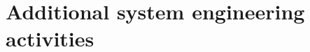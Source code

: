%
\thispagestyle{fancy}
\chapter{Additional system engineering activities}
\label{chp:add_sys_eng_act}
